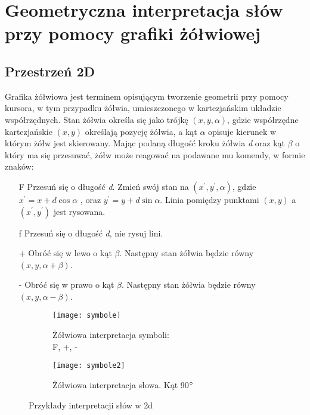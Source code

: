 \documentclass[12pt]{report}
\begin{document}
\begin{sloppypar}
\section{Geometryczna interpretacja słów przy pomocy grafiki żółwiowej} 
\subsection{Przestrzeń 2D}               
Grafika żółwiowa jest terminem opisującym tworzenie geometrii przy pomocy kursora, w tym przypadku żółwia, umieszczonego w kartezjańskim układzie współrzędnych. Stan żółwia określa się jako trójkę \textit{$(x,y,\alpha)$}, gdzie współrzędne kartezjańskie \textit{$(x,y)$} określają pozycję żółwia, a kąt \textit{$\alpha$} opisuje kierunek w którym żółw jest skierowany. Mając podaną długość kroku żółwia \textit{d} oraz kąt \textit{$\beta$} o który ma się przesuwać, żółw może reagować na podawane mu komendy, w formie znaków:
\newpage
\begin{itemize}[labelindent=1.5em,labelsep=2cm,leftmargin=*]
\item[F] Przesuń się o długość \textit{d}. Zmień swój stan na \textit{$(x^\prime,y^\prime,\alpha)$}, gdzie $x^\prime = x+d\cos\alpha$ , oraz $y^\prime = y+d\sin\alpha$. Linia pomiędzy punktami \textit{$(x,y)$} a \textit{$(x^\prime,y^\prime)$} jest rysowana.
\item[f] Przesuń się o długość \textit{d}, nie rysuj lini.
\item[+] Obróć się w lewo o kąt \textit{$\beta$}. Następny stan żółwia będzie równy \textit{$(x,y,\alpha+\beta)$}.
\item[-] Obróć się w prawo o kąt \textit{$\beta$}. Następny stan żółwia będzie równy \textit{$(x,y,\alpha-\beta)$}.
\end{itemize}

\begin{figure}
\centering
\begin{subfigure}{.5\textwidth}
  \centering
  \texttt{[image: symbole]}
  \caption{Żółwiowa interpretacja symboli:\\F, +, -  }
  \label{fig:sub1}
\end{subfigure}%
\begin{subfigure}{.5\textwidth}
  \centering
  \texttt{[image: symbole2]}
  \caption{Żółwiowa interpretacja słowa. Kąt 90$\degree$}
  \label{fig:sub2}
\end{subfigure}
\caption{Przykłady interpretacji słów w 2d \cite{prusinABOP}}
\label{fig:test}
\end{figure}

\end{sloppypar}
\end{document}
